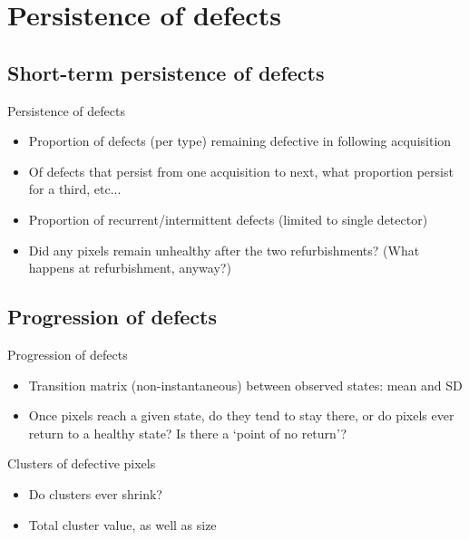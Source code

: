 \documentclass{beamer}
\begin{document}


\section{Persistence of defects}

\subsection{Short-term persistence of defects}
\begin{frame}{Persistence of defects}

	\begin{itemize}
		\item Proportion of defects (per type) remaining defective in following acquisition
		\item Of defects that persist from one acquisition to next, what proportion persist for a third, etc...
		\item Proportion of recurrent/intermittent defects (limited to single detector)
		\item Did any pixels remain unhealthy after the two refurbishments? (What happens at refurbishment, anyway?)
	\end{itemize}
\end{frame}

\subsection{Progression of defects}
\begin{frame}{Progression of defects}
	\begin{itemize}
		\item Transition matrix (non-instantaneous) between observed states: mean and SD
		\item Once pixels reach a given state, do they tend to stay there, or do pixels ever return to a healthy state? Is there a `point of no return'?
	\end{itemize}

\end{frame}

\begin{frame}{Clusters of defective pixels}
	\begin{itemize}
		\item Do clusters ever shrink?
		\item Total cluster value, as well as size
		
	\end{itemize}

\end{frame}
\end{document}
